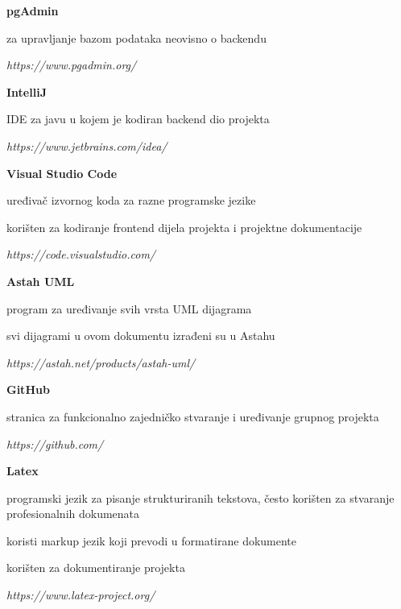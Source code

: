 \begin{packed_item}
				\item \textbf{pgAdmin}
				\begin{packed_item}
					\item za upravljanje bazom podataka neovisno o backendu 
					\item \textit{ https://www.pgadmin.org/}
				\end{packed_item}

				\item \textbf{IntelliJ }
				\begin{packed_item}
					\item  IDE za javu u kojem je kodiran backend dio projekta 
					\item \textit{ https://www.jetbrains.com/idea/}
				\end{packed_item}

				\item \textbf{Visual Studio Code}
				\begin{packed_item}
					\item  uređivač izvornog koda za razne programske jezike
					\item  korišten za kodiranje frontend dijela projekta i projektne dokumentacije
					\item \textit{ https://code.visualstudio.com/}
				\end{packed_item}

				\item \textbf{Astah UML }
				\begin{packed_item}
					\item program za uređivanje svih vrsta UML dijagrama
					\item svi dijagrami u ovom dokumentu izrađeni su u Astahu 
					\item \textit{https://astah.net/products/astah-uml/}
				\end{packed_item}

				\item \textbf{GitHub }
				\begin{packed_item}
					\item  stranica za funkcionalno zajedničko stvaranje i uređivanje grupnog projekta 
					\item \textit{https://github.com/}
				\end{packed_item}

				\item \textbf{Latex}
				\begin{packed_item}
					\item programski jezik za pisanje strukturiranih tekstova, često korišten za stvaranje profesionalnih dokumenata
					\item koristi markup jezik koji prevodi u formatirane dokumente
					\item korišten za dokumentiranje projekta
					\item \textit{https://www.latex-project.org/}
				\end{packed_item}
			\end{packed_item}
			
